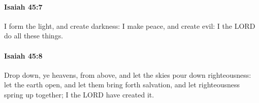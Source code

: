 		\paragraph{Isaiah 45:7} %
			\label{ISAIAH-45-7}

			I form the light, and create darkness: I make peace, and create evil: I the LORD do all these things.


		\paragraph{Isaiah 45:8} %
			\label{ISAIAH-45-8}

			Drop down, ye heavens, from above, and let the skies pour down righteousness: let the earth open, and let them bring forth salvation, and let righteousness spring up together; I the LORD have created it.



